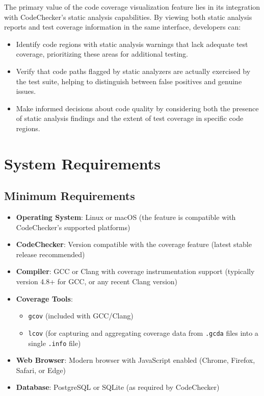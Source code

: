 The primary value of the code coverage visualization feature lies in its integration with CodeChecker's static analysis capabilities. By viewing both static analysis reports and test coverage information in the same interface, developers can:

\begin{itemize}
    \item Identify code regions with static analysis warnings that lack adequate test coverage, prioritizing these areas for additional testing.
    \item Verify that code paths flagged by static analyzers are actually exercised by the test suite, helping to distinguish between false positives and genuine issues.
    \item Make informed decisions about code quality by considering both the presence of static analysis findings and the extent of test coverage in specific code regions.
\end{itemize}

\section{System Requirements}

\subsection{Minimum Requirements}

\begin{itemize}
    \item \textbf{Operating System}: Linux or macOS (the feature is compatible with CodeChecker's supported platforms)
    \item \textbf{CodeChecker}: Version compatible with the coverage feature (latest stable release recommended)
    \item \textbf{Compiler}: GCC or Clang with coverage instrumentation support (typically version 4.8+ for GCC, or any recent Clang version)
    \item \textbf{Coverage Tools}: 
    \begin{itemize}
        \item \texttt{gcov} (included with GCC/Clang)
        \item \texttt{lcov} (for capturing and aggregating coverage data from \texttt{.gcda} files into a single \texttt{.info} file)
    \end{itemize}
    \item \textbf{Web Browser}: Modern browser with JavaScript enabled (Chrome, Firefox, Safari, or Edge)
    \item \textbf{Database}: PostgreSQL or SQLite (as required by CodeChecker)
\end{itemize}

